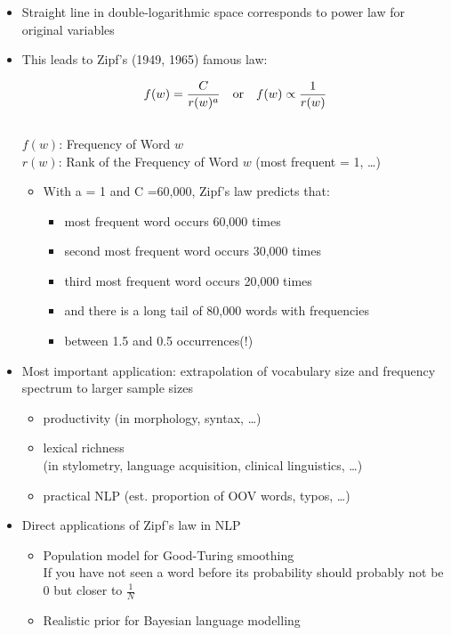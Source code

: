 \documentclass[a4paper,landscape,headrule,footrule,dvips]{foils}
\begin{document}
\begin{CJK}{UTF8}{min}

\begin{itemize}
\item Straight line in double-logarithmic space corresponds to
power law for original variables
\item This leads to Zipf’s (1949, 1965) famous law:

  \begin{equation}
    \label{eq:1}
    f(w) = \frac{C}{r(w)^a}\ \ \  \textnormal{or} \ \ \  f(w) \propto \frac{1}{r(w)}
  \end{equation}
\\ $f(w)$: Frequency of Word $w$
 \\ $r(w)$: Rank of the Frequency of Word $w$ (most frequent = 1, \ldots)

\begin{itemize}
  \item With a = 1 and C =60,000, Zipf’s law predicts that:
\begin{itemize}
  \item most frequent word occurs 60,000 times
  \item second most frequent word occurs 30,000 times
  \item third most frequent word occurs 20,000 times
  \item and there is a long tail of 80,000 words with frequencies
  \item between 1.5 and 0.5 occurrences(!)
  \end{itemize}
\end{itemize}
\end{itemize}

\begin{itemize}
  \item Most important application: extrapolation of vocabulary
size and frequency spectrum to larger sample sizes
\begin{itemize}
  \item productivity (in morphology, syntax, \ldots)
  \item lexical richness
\\ (in stylometry, language acquisition, clinical linguistics, \ldots)
\item practical NLP (est. proportion of OOV words, typos, \ldots)
\end{itemize}
\item Direct applications of Zipf’s law in NLP
\begin{itemize}
\item Population model for Good-Turing smoothing \\ If you have not
  seen a word before its probability should probably not be $0$ but
  closer to $\frac{1}{N}$
  \item Realistic prior for Bayesian language modelling
  \end{itemize}
\end{itemize}



\end{CJK}
\end{document}
